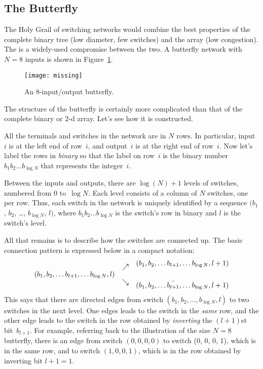 \subsection{The Butterfly}

The Holy Grail of switching networks would combine the best properties
of the complete binary tree (low diameter, few switches) and the array
(low congestion).  The  is a widely-used compromise
between the two. A butterfly network with $N = 8$ inputs is shown in
Figure~\ref{fig:6EN}.

\begin{figure}

\missinggraphic

\texttt{[image: missing]}

\caption{An 8-input/output butterfly.}

\label{fig:6EN}

\end{figure}

The structure of the butterfly is certainly more complicated than that
of the complete binary or 2-d array.  Let's see how it is constructed.

All the terminals and switches in the network are in $N$ rows.  In
particular, input~$i$ is at the left end of row~$i$, and output~$i$ is
at the right end of row~$i$.  Now let's label the rows in
\emph{binary} so that the label on row~$i$ is the binary number
$b_1b_2\dots b_{\log N}$ that represents the integer~$i$.

Between the inputs and outputs, there are $\log(N) + 1$ levels of
switches, numbered from 0 to~$\log N$.  Each level consists of a
column of $N$ switches, one per row.  Thus, each switch in the network
is uniquely identified by a sequence $(b_1$, $b_2$, \dots, $b_{\log
  N}$, $l)$, where $b_1 b_2 \dots b_{\log N}$ is the switch's row in
binary and $l$ is the switch's level.

All that remains is to describe how the switches are connected up.
The basic connection pattern is expressed below in a compact notation:
\begin{equation*}
\begin{array}{lcr}
    &\raisebox{-5pt}{$\nearrow$}& (b_1, b_2, \dots b_{l + 1}, \dots b_{\log N}, l + 1) \\
(b_1, b_2, \dots b_{l + 1}, \dots b_{\log N}, l) &\\
    &\raisebox{5pt}{$\searrow$}& (b_1, b_2, \dots \bar{b_{l + 1}}, \dots b_{\log N}, l + 1) \\
\end{array}
\end{equation*}
This says that there are directed edges from switch $(b_1, b_2, \dots,
b_{\log N}, l)$ to two switches in the next level.  One edges leads to
the switch in the \emph{same} row, and the other edge leads to the
switch in the row obtained by \emph{inverting} the $(l + 1)$st
bit~$b_{l + 1}$.  For example, referring back to the illustration of
the size $N = 8$ butterfly, there is an edge from switch $(0, 0, 0,
0)$ to switch (0, 0, 0, 1), which is in the same row, and to switch
$(1, 0, 0, 1)$, which is in the row obtained by inverting bit $l + 1 =
1$.

